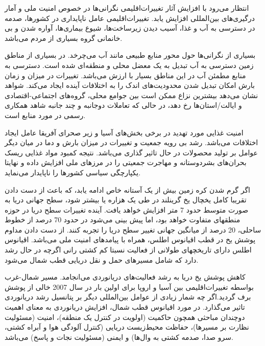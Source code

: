 \begin{enumerate}
انتظار می‌رود با افزایش آثار تغییرات‌اقلیمی نگرانی‌ها در خصوص امنیت ملی و آمار درگیری‌های بین‌المللی افزایش یابد. تغییرات‌اقلیمی عامل ناپایداری در کشور‌ها، صدمه در دسترسی به آب و غذا، آسیب دیدن زیرساخت‌ها، شیوع بیماری‌ها، آواره شدن و بی خانمانی گروه بسیاری از مردم می‌باشد. 

بسیاری از نگرانی‌ها حول محور منابع طبیعی مانند آب می‌چرخد. در بسیاری از مناطق زمین دسترسی به آب تبدیل به یک معضل محلی و منطقه‌ای شده است. دسترسی به منابع مطمئن آب در این مناطق بسیار با ارزش می‌باشد. تغییرات در میزان و زمان بارش امکان تبدیل شدن محدودیت‌های‌ اندک را به اختلافات آینده ایجاد می‌کند.
شواهد نشان می‌دهد بیشترین نزاع ممکن است بین جوامع محلی، گروه‌های اجتماعی-اقتصادی و ایالت/استان‌ها رخ دهد، در حالی که تعاملات دوجانبه و چند جانبه شاهد همکاری رسمی در مورد منابع است.

امنیت غذایی مورد تهدید در برخی بخش‌های آسیا و زیر صحرای آفریقا عامل ایجاد اختلافات می‌باشد. رشد بی رویه جمعیت و تغییرات در میزان بارش و دما در میان دیگر عوامل بر تولید محصولات در حال تاثیر گذاری می‌باشد. نتیجه کمبود مواد غذایی ریسک بحران‌های بشردوستانه و مهاجرت جمعیتی را در مرز‌های ملی افزایش داده و نهایتا یکپارچگی سیاسی کشور‌ها را ناپایدار می‌نماید.

اگر گرم شدن کره زمین بیش از یک آستانه خاص ادامه یابد، که باعث از دست دادن تقریبا کامل یخچال یخ گرینلند در طی یک هزاره یا بیشتر شود، سطح جهانی دریا به صورت متوسط حدود 7 متر افزایش خواهد یافت. آینده تغییرات سطح دریا در حوزه منطقهای متفاوت خواهد بود، اما پیش بینی می‌شود در حدود 70 درصد از خطوط ساحلی، 20 درصد از میانگین جهانی تغییر سطح دریا را تجربه کنند. از دست دادن مداوم پوشش یخ در قطب اقیانوس اطلس، همراه با پیامد‌های امنیت ملی می‌باشد. اقیانوس اطلس دارای تاریخچهای طولانی از فعالیت نسبتا کم کشتی رانی اگرچه در حال رشد دارد که شامل مسیر‌های حمل و نقل دریایی قطب شمال می‌شود. 

کاهش پوشش یخ دریا به رشد فعالیت‌های دریانوردی می‌انجامد. مسیر شمال-غرب بواسطه تغییرات‌اقلیمی بین آسیا و اروپا برای اولین بار در سال 2007 خالی از پوشش برف گردید.اگر چه شمار زیادی از عوامل بین‌المللی دیگر بر پتانسیل رشد دریانوردی تاثیر می‌گذارد. در مورد اقیانوس قطب شمال، افزایش دریانوردی به معنای اهمیت دوچندان مباحثی همچون حاکمیت (اولویت در کنترل یک منطقه)، امنیت (مسئولیت نظارت بر مسیر‌ها)، حفاظت  محیط‌زیست دریایی (کنترل آلودگی هوا و آبراه کشتی، سرو صدا، صدمه کشتی به وال‌ها) و ایمنی (مسئولیت نجات و پاسخ) می‌باشد. 


\end{enumerate}
